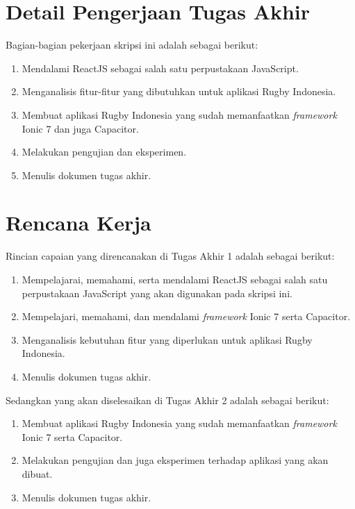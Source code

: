 \documentclass[a4paper,twoside]{article}
\begin{document}
\section{Detail Pengerjaan Tugas Akhir}
Bagian-bagian pekerjaan skripsi ini adalah sebagai berikut:
\begin{enumerate}
    \item Mendalami ReactJS sebagai salah satu perpustakaan JavaScript.
    \item Menganalisis fitur-fitur yang dibutuhkan untuk aplikasi Rugby Indonesia.
    \item Membuat aplikasi Rugby Indonesia yang sudah memanfaatkan \textit{framework} Ionic 7 dan juga Capacitor.
    \item Melakukan pengujian dan eksperimen.
    \item Menulis dokumen tugas akhir.
\end{enumerate}

\section{Rencana Kerja}
Rincian capaian yang direncanakan di Tugas Akhir 1 adalah sebagai berikut:
\begin{enumerate}
    \item Mempelajarai, memahami, serta mendalami ReactJS sebagai salah satu perpustakaan JavaScript yang akan digunakan pada skripsi ini.
    \item Mempelajari, memahami, dan mendalami \textit{framework} Ionic 7 serta Capacitor.
    \item Menganalisis kebutuhan fitur yang diperlukan untuk aplikasi Rugby Indonesia.
    \item Menulis dokumen tugas akhir.
\end{enumerate}

Sedangkan yang akan diselesaikan di Tugas Akhir 2 adalah sebagai berikut:
\begin{enumerate}
    \item Membuat aplikasi Rugby Indonesia yang sudah memanfaatkan \textit{framework} Ionic 7 serta Capacitor.
    \item Melakukan pengujian dan juga eksperimen terhadap aplikasi yang akan dibuat.
    \item Menulis dokumen tugas akhir.
\end{enumerate}
\end{document}
